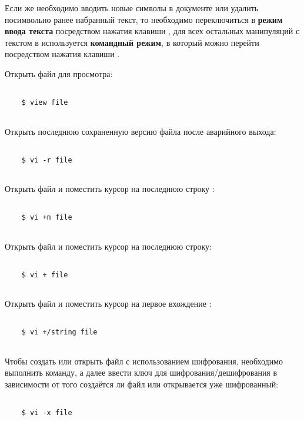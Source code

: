 Если же необходимо вводить новые символы в документе или удалить посимвольно ранее набранный текст, то необходимо переключиться в \textbf{режим ввода текста} посредством нажатия клавиши , для всех остальных манипуляций с текстом в  используется \textbf{командный режим}, в который можно перейти посредством нажатия клавиши .

\noindent
Открыть файл  для просмотра:
\begin{lstlisting}
	
	$ view file
	
\end{lstlisting}	

\noindent
Открыть последнюю сохраненную версию файла  после аварийного выхода:
\begin{lstlisting}

	$ vi -r file
	
\end{lstlisting}	

\noindent
Открыть файл  и поместить курсор на последнюю строку :
\begin{lstlisting}
	
	$ vi +n file
	
\end{lstlisting}	

\noindent
Открыть файл  и поместить курсор на последнюю строку:
\begin{lstlisting}
	
	$ vi + file
	
\end{lstlisting}	

\noindent
Открыть файл  и поместить курсор на первое вхождение :
\begin{lstlisting}
	
	$ vi +/string file
	
\end{lstlisting}	

\noindent
Чтобы создать или открыть файл  с использованием шифрования, необходимо выполнить команду, а далее ввести ключ для шифрования/дешифрования в зависимости от того создаётся ли файл или открывается уже шифрованный:

\begin{lstlisting}
	
	$ vi -x file
	
\end{lstlisting}	



